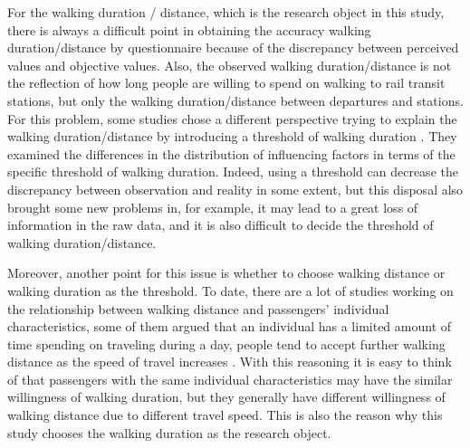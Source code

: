 %
For the walking duration / distance, which is the research object in this study, there is always a difficult point in obtaining the accuracy walking duration/distance by questionnaire because of the discrepancy between perceived values and objective values. Also, the observed walking duration/distance is not the reflection of how long people are willing to spend on walking to rail transit stations, but only the walking duration/distance between departures and stations. For this problem, some studies chose a different perspective trying to explain the walking duration/distance by introducing a threshold of walking duration \cite{besser2005walking,mccormack2008objective}. They examined the differences in the distribution of influencing factors in terms of the specific threshold of walking duration. Indeed, using a threshold can decrease the discrepancy between observation and reality in some extent, but this disposal also brought some new problems in, for example, it may lead to a great loss of information in the raw data, and it is also difficult to decide the threshold of walking duration/distance.

%
Moreover, another point for this issue is whether to choose walking distance or walking duration as the threshold. To date, there are a lot of studies working on the relationship between walking distance and passengers' individual characteristics, some of them argued that an individual has a limited amount of time spending on traveling during a day, people tend to accept further walking distance as the speed of travel increases \cite{marchetti1994anthropological,larsen2010beyond}. With this reasoning it is easy to think of that passengers with the same individual characteristics may have the similar willingness of walking duration, but they generally have different willingness of walking distance due to different travel speed. This is also the reason why this study chooses the walking duration as the research object.

